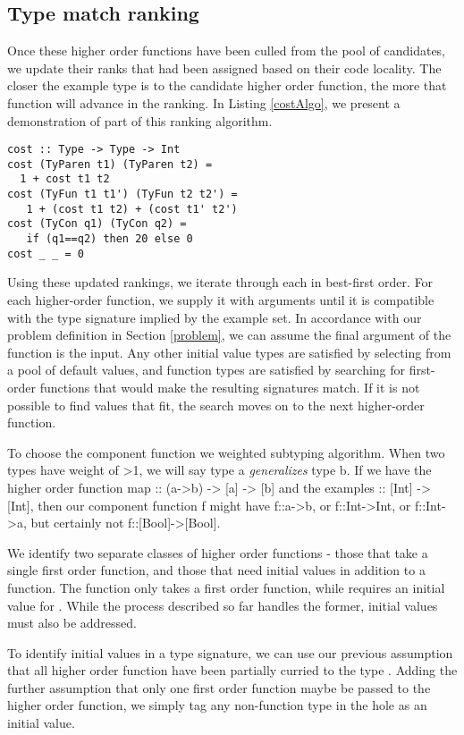 \subsection{Type match ranking}



Once these higher order functions have been culled from the pool of candidates, we update their ranks that had been assigned based on their code locality.
The closer the example type is to the candidate higher order function, the more that function will advance in the ranking.
In Listing \ref{costAlgo}, we present a demonstration of part of this ranking algorithm.

\begin{lstlisting}[caption=Type closeness ranking algorithm,label=costAlgo]
cost :: Type -> Type -> Int
cost (TyParen t1) (TyParen t2) =
  1 + cost t1 t2
cost (TyFun t1 t1') (TyFun t2 t2') =
   1 + (cost t1 t2) + (cost t1' t2')
cost (TyCon q1) (TyCon q2) =
   if (q1==q2) then 20 else 0
cost _ _ = 0
\end{lstlisting}

Using these updated rankings, we iterate through each in best-first order. For each higher-order function, we supply it with arguments until it is compatible with the type signature implied by the example set. In accordance with our problem definition in Section \ref{problem}, we can assume the final argument of the function is the input. Any other initial value types are satisfied by selecting from a pool of default values, and function types are satisfied by searching for first-order functions that would make the resulting signatures match. If it is not possible to find values that fit, the search moves on to the next higher-order function.

To choose the component function we weighted subtyping algorithm.
When two types have weight of >1, we will say type a \textit{generalizes} type b.
If we have the higher order function map :: (a->b) -> [a] -> [b] and the examples :: [Int] -> [Int], then our component function f might have f::a->b, or f::Int->Int, or f::Int->a, but certainly not f::[Bool]->[Bool].

We identify two separate classes of higher order functions - those that take a single first order function, and those that need initial values in addition to a function. The  function only takes a first order function, while  requires an initial value for . While the process described so far handles the former, initial values must also be addressed.

To identify initial values in a type signature, we can use our previous assumption that all higher order function have been partially curried to the type \codeinline{_ -> *-> *}. Adding the further assumption that only one first order function maybe be passed to the higher order function, we simply tag any non-function type in the hole as an initial value.


